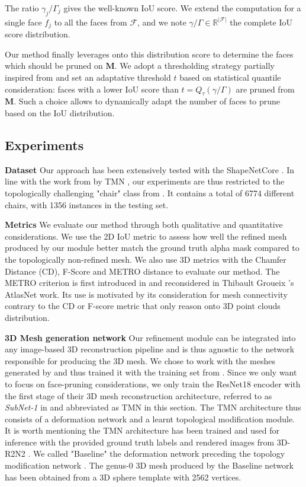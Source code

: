 The ratio $\gamma_{j}/\Gamma_{j}$ gives the well-known IoU score. We extend the computation for a single face $f_{j}$ to all the faces from $\mathcal{F}$, and we note $\gamma/\Gamma \in \mathbb{R}^{|\mathcal{F}|}$ the complete IoU score distribution.

Our method finally leverages onto this distribution score to determine the faces which should be pruned on $\mathbf{M}$. We adopt a thresholding strategy partially inspired from \citep{pan2019deep} and set an adaptative threshold $t$ based on statistical quantile consideration: faces with a lower IoU score than $t=Q_{\tau}(\gamma/\Gamma)$ are pruned from $\mathbf{M}$. Such a choice allows to dynamically adapt the number of faces to prune based on the IoU distribution. 

\subsection{Experiments}
\label{sec:experiments}

\textbf{Dataset} Our approach has been extensively tested with the ShapeNetCore \citep{chang2015shapenet}. In line with the work from by TMN \citep{pan2019deep}, our experiments are thus restricted to the topologically challenging "chair" class from \citep{chang2015shapenet}. It contains a total of 6774 different chairs, with 1356 instances in the testing set.

\noindent\textbf{Metrics} We evaluate our method through both qualitative and quantitative considerations. We use the 2D IoU metric to assess how well the refined mesh produced by our module better match the ground truth alpha mask compared to the topologically non-refined mesh. We also use 3D metrics with the Chamfer Distance (CD), F-Score and METRO distance to evaluate our method. The METRO criterion is first introduced in \citep{cignoni1998metro} and reconsidered in Thibault Groueix \etal 's AtlasNet \citep{groueix2018papier} work. Its use is motivated by its consideration for mesh connectivity contrary to the CD or F-score metric that only reason onto 3D point clouds distribution. 


\noindent\textbf{3D Mesh generation network} Our refinement module can be integrated into any image-based 3D reconstruction pipeline and is thus agnostic to the network responsible for producing the 3D mesh. We chose to work with the meshes generated by \citep{pan2019deep} and thus trained it with the training set from \citep{chang2015shapenet}. Since we only want to focus on face-pruning considerations, we only train the ResNet18 encoder with the first stage of their 3D mesh reconstruction architecture, referred to as \textit{SubNet-1} in \citep{pan2019deep} and abbreviated as TMN in this section. The TMN architecture thus consists of a deformation network and a learnt topological modification module. It is worth mentioning the TMN \citep{pan2019deep} architecture has been trained and used for inference with the provided ground truth labels and rendered images from 3D-R2N2 \citep{choy20163d}. We called "Baseline" the deformation network preceding the topology modification network \citep{pan2019deep}. The genus-0 3D mesh produced by the Baseline network has been obtained from a 3D sphere template with 2562 vertices. 


